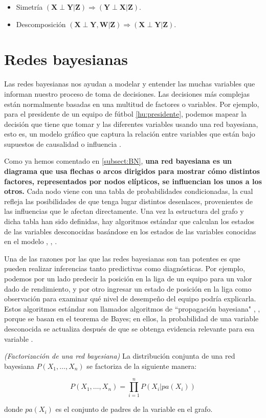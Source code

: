 \begin{itemize}
 \item Simetría $(\mathbf{X} \perp \mathbf{Y} | \mathbf{Z}) \Rightarrow (\mathbf{Y} \perp \mathbf{X} | \mathbf{Z})$.
 \item Descomposición $(\mathbf{X} \perp \mathbf{Y, W} | \mathbf{Z}) \Rightarrow (\mathbf{X} \perp \mathbf{Y} | \mathbf{Z})$.
\end{itemize}

\section{Redes bayesianas}

Las redes bayesianas nos ayudan a modelar y entender las muchas variables que informan nuestro proceso de 
toma de decisiones. Las decisiones más complejas están normalmente basadas en una multitud de factores o 
variables. Por ejemplo, para el presidente de un equipo de fútbol \ref{hu:presidente}, podemos 
mapear la decisión que tiene que tomar y las diferentes variables usando 
una red bayesiana, esto es, un modelo gráfico que captura la relación entre variables que están bajo 
supuestos de causalidad o influencia \cite{things-to-know-BN}.

Como ya hemos comentado en \ref{subsect:BN}, \textbf{una red bayesiana es un diagrama que 
usa flechas o arcos dirigidos para mostrar cómo distintos factores, representados por nodos elípticos, se 
influencian los unos a los otros.} Cada nodo viene con una tabla de probabilidades condicionadas, la cual 
refleja las posibilidades de que tenga lugar distintos desenlaces, provenientes de las influencias que 
le afectan directamente. Una vez la estructura del grafo y dicha tabla han sido definidas, hay algoritmos 
estándar que calculan los estados de las variables desconocidas basándose en los estados de las variables 
conocidas en el modelo \cite{learning-algorithms-BN-comparison}, \cite{BN-achilles-heel}, 
\cite{different-algorithmic-schemes}.

Una de las razones por las que las redes bayesianas son tan potentes es que pueden realizar inferencias 
tanto predictivas como diagnósticas. Por ejemplo, podemos por un lado predecir la posición en la liga de 
un equipo para un valor dado de rendimiento, y por otro ingresar un estado de posición en la 
liga como observación para examinar qué nivel de desempeño del equipo podría explicarla. Estos algoritmos 
estándar son llamados algoritmos de ``propagación bayesiana" \cite{Cano2004}, \cite{more-algorithms}, 
\cite{back-prop} porque se basan en el teorema de Bayes; en ellos, la probabilidad de una variable 
desconocida se actualiza después de que se obtenga evidencia relevante para esa variable \cite{prop-alg}.

\begin{theorem}\emph{(Factorización de una red bayesiana)} 
La distribución conjunta de una red bayesiana $P(X_1, \dots, X_n)$ se factoriza de la siguiente manera:

$$P(X_1, \dots, X_n) = \prod_{i=1}^n P(X_i|pa(X_i))$$

donde $pa(X_i)$ es el conjunto de padres de la variable en el grafo. 
\end{theorem}

